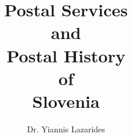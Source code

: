 
\title{Postal Services\\and\\Postal History\\of\\Slovenia}  %
\author{Dr. Yiannis Lazarides}      %
